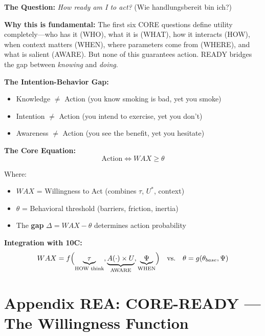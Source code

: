 \begin{tcolorbox}[colback=purple!5!white, colframe=purple!75!black,
    title=\textbf{CORE-READY: The Seventh Fundamental Question (10C)}]

\textbf{The Question:} \textit{How ready am I to act?} (Wie handlungsbereit bin ich?)

\textbf{Why this is fundamental:} The first six CORE questions define utility completely---who has it (WHO), what it is (WHAT), how it interacts (HOW), when context matters (WHEN), where parameters come from (WHERE), and what is salient (AWARE). But none of this guarantees action. READY bridges the gap between \textit{knowing} and \textit{doing}.

\textbf{The Intention-Behavior Gap:}
\begin{itemize}[nosep]
    \item Knowledge $\neq$ Action (you know smoking is bad, yet you smoke)
    \item Intention $\neq$ Action (you intend to exercise, yet you don't)
    \item Awareness $\neq$ Action (you see the benefit, yet you hesitate)
\end{itemize}

\textbf{The Core Equation:}
\[
\boxed{\text{Action} \Leftrightarrow WAX \geq \theta}
\]

Where:
\begin{itemize}[nosep]
    \item $WAX$ = Willingness to Act (combines $\tau$, $U^*$, context)
    \item $\theta$ = Behavioral threshold (barriers, friction, inertia)
    \item The \textbf{gap} $\Delta = WAX - \theta$ determines action probability
\end{itemize}

\textbf{Integration with 10C:}
\[
WAX = f\Bigl(\underbrace{\tau}_{\text{HOW think}}, \underbrace{A(\cdot) \times U}_{\text{AWARE}}, \underbrace{\Psi}_{\text{WHEN}}\Bigr) \quad \text{vs.} \quad \theta = g(\theta_{base}, \Psi)
\]

\end{tcolorbox}

\section*{Appendix REA: CORE-READY — The Willingness Function}
\label{app:core-ready}
\label{app:willingness-formalization}

